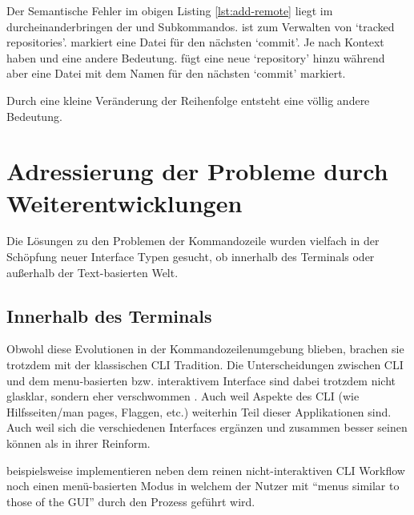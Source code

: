 \documentclass[oneside,bibliography=totocnumbered,BCOR=5mm]{scrbook}
\newenvironment{code}{\captionsetup{type=listing, skip=0pt}}{}
\begin{document}
\begin{code}
  \label{lst:add-remote}
  \medskip
\end{code}

Der Semantische Fehler im obigen Listing \ref{lst:add-remote} liegt im
durcheinanderbringen der  und  Subkommandos.
 ist zum Verwalten von `tracked repositories'.
 markiert eine Datei für den nächsten `commit'. Je nach
Kontext haben  und  eine andere Bedeutung.
 fügt eine neue `repository' hinzu während
 aber eine Datei mit dem Namen 
für den nächsten `commit' markiert.

Durch eine kleine Veränderung der Reihenfolge entsteht eine völlig andere
Bedeutung.

\section{Adressierung der Probleme durch Weiterentwicklungen}
\label{sec:weiterentwicklungen}

Die Lösungen zu den Problemen der Kommandozeile wurden vielfach in der Schöpfung
neuer Interface Typen gesucht, ob innerhalb des Terminals oder außerhalb der
Text-basierten Welt.

\subsection{Innerhalb des Terminals}

Obwohl diese Evolutionen in der Kommandozeilenumgebung blieben, brachen sie
trotzdem mit der klassischen CLI Tradition. Die Unterscheidungen zwischen
CLI und dem menu-basierten bzw. interaktivem Interface sind dabei trotzdem
nicht glasklar, sondern eher verschwommen \parencite{Paap_1988}. Auch weil
Aspekte des CLI (wie Hilfsseiten/man pages, Flaggen, etc.) weiterhin Teil dieser
Applikationen sind. Auch weil sich die verschiedenen Interfaces ergänzen und
zusammen besser seinen können als in ihrer Reinform.

\textcite{bland2007design} beispielsweise implementieren neben dem reinen
nicht-interaktiven CLI Workflow noch einen menü-basierten Modus in welchem der
Nutzer mit ``menus similar to those of the GUI'' durch den Prozess geführt wird.
\end{document}
